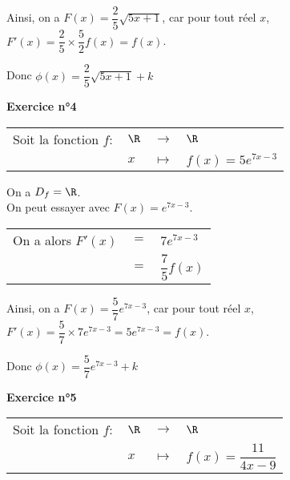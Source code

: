 Ainsi, on a $F(x) = \dfrac{2}{5}\sqrt{5x+1}$, car pour tout réel $x$, $F'\left(x\right) = \dfrac{2}{5}\times \dfrac{5}{2}f\left(x\right) = f\left(x\right)$. 

\vspace*{.5cm}

Donc $\phi\left(x\right) = \dfrac{2}{5} \sqrt{5x+1} + k$ \\

\vspace*{2cm}

\textbf{Exercice n°4} \\

\begin{tabular}{llll}
\hspace*{-.3cm} Soit la fonction $f:$ & $\R$ & $\longrightarrow$ & $\R$ \vspace*{.3cm} \\
& $x$ & $\longmapsto$ & $f(x) = 5e^{7x-3}$ \\
\end{tabular}

\vspace*{.3cm}

On a $D_f = \R$. \\

On peut essayer avec $F(x) = e^{7x - 3}$. \\

\begin{tabular}{lll}
\hspace*{-.3cm} On a alors $F'(x)$ & $=$ & $ 7e^{7x-3}$ \\
& $=$ & $ \dfrac{7}{5}f\left(x\right)$ \\
\end{tabular}

\vspace*{.5cm}

Ainsi, on a $F(x) = \dfrac{5}{7}e^{7x - 3}$, car pour tout réel $x$, $F'\left(x\right) = \dfrac{5}{7} \times 7e^{7x-3} = 5e^{7x-3} = f\left(x\right)$. 

\vspace*{.5cm}

Donc $\phi\left(x\right) = \dfrac{5}{7}e^{7x - 3} + k$ 

\newpage

\vspace*{-2cm}

\textbf{Exercice n°5} 

\begin{tabular}{llll}
\hspace*{-.3cm} Soit la fonction $f:$ & $\R$ & $\longrightarrow$ & $\R$ \\
& $x$ & $\longmapsto$ & $f(x) = \dfrac{11}{4x-9}$ \\
\end{tabular}

